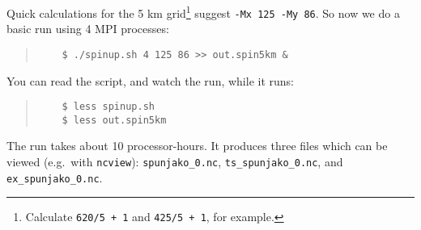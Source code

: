 Quick calculations for the 5 km grid\footnote{Calculate \texttt{620/5 + 1} and \texttt{425/5 + 1}, for example.} suggest \verb|-Mx 125 -My 86|.  So now we do a basic run using 4 MPI processes:
\begin{quote}\small
\begin{verbatim}
    $ ./spinup.sh 4 125 86 >> out.spin5km &
\end{verbatim}
\normalsize\end{quote}
You can read the script, and watch the run, while it runs:
\begin{quote}\small
\begin{verbatim}
    $ less spinup.sh
    $ less out.spin5km
\end{verbatim}
\normalsize\end{quote}

The run takes about 10 processor-hours.   %
It produces three files which can be viewed (e.g.~with \verb|ncview|): \verb|spunjako_0.nc|, \verb|ts_spunjako_0.nc|, and \verb|ex_spunjako_0.nc|.

